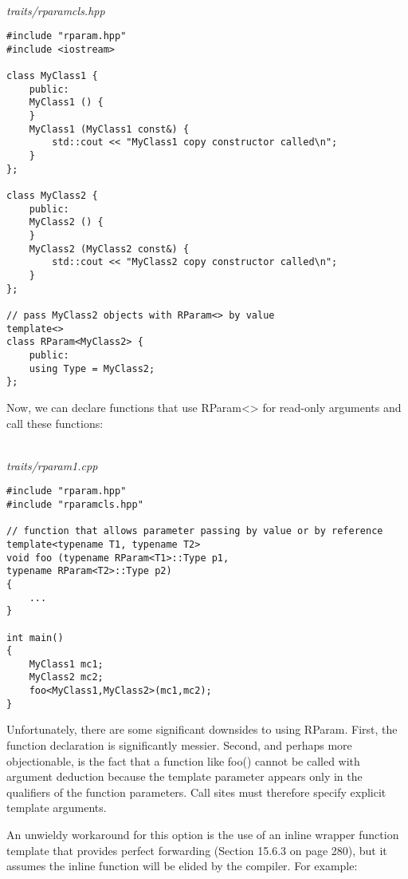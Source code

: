 \hspace*{\fill} \\ %
\noindent
\textit{traits/rparamcls.hpp}
\begin{lstlisting}[style=styleCXX]
#include "rparam.hpp"
#include <iostream>

class MyClass1 {
	public:
	MyClass1 () {
	}
	MyClass1 (MyClass1 const&) {
		std::cout << "MyClass1 copy constructor called\n";
	}
};

class MyClass2 {
	public:
	MyClass2 () {
	}
	MyClass2 (MyClass2 const&) {
		std::cout << "MyClass2 copy constructor called\n";
	}
};

// pass MyClass2 objects with RParam<> by value
template<>
class RParam<MyClass2> {
	public:
	using Type = MyClass2;
};
\end{lstlisting}

Now, we can declare functions that use RParam<> for read-only arguments and call these functions:

\hspace*{\fill} \\ %
\noindent
\textit{traits/rparam1.cpp}
\begin{lstlisting}[style=styleCXX]
#include "rparam.hpp"
#include "rparamcls.hpp"

// function that allows parameter passing by value or by reference
template<typename T1, typename T2>
void foo (typename RParam<T1>::Type p1,
typename RParam<T2>::Type p2)
{
	...
}

int main()
{
	MyClass1 mc1;
	MyClass2 mc2;
	foo<MyClass1,MyClass2>(mc1,mc2);
}
\end{lstlisting}

Unfortunately, there are some significant downsides to using RParam. First, the function declaration is significantly messier. Second, and perhaps more objectionable, is the fact that a function like foo() cannot be called with argument deduction because the template parameter appears only in the qualifiers of the function parameters. Call sites must therefore specify explicit template arguments.

An unwieldy workaround for this option is the use of an inline wrapper function template that provides perfect forwarding (Section 15.6.3 on page 280), but it assumes the inline function will be elided by the compiler. For example:

